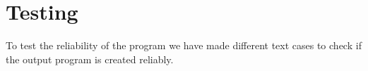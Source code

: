 \section{Testing}

To test the reliability of the program we have made different text cases to check if the output program is created reliably.